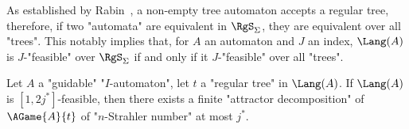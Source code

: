 \documentclass[a4paper,UKenglish,cleveref, autoref, thm-restate]{lipics-v2021}
\begin{document}
\begin{remark}\label{rem:regular-generalises}
As established by Rabin~\cite[Theorem 20]{RabinRegular}, a non-empty tree automaton accepts a regular tree, therefore, if two "automata" are equivalent in $\RgS_\Sigma$, they are equivalent over all "trees". This notably implies that, for $A$ an automaton and $J$ an index, $\Lang(A)$ is $J$-"feasible" over $\RgS_\Sigma$ if and only if it $J$-"feasible" over all "trees".
\end{remark}

\begin{lemma}
	Let $A$ a "guidable" "$I$-automaton", let $t$ a "regular tree" in $\Lang(A)$. If $\Lang(A)$ is $[1,2j^*]$-feasible, then there exists a finite "attractor decomposition" of $\AGame{A}{t}$ of "$n$-Strahler number" at most $j^*$.
\end{lemma}
\end{document}

